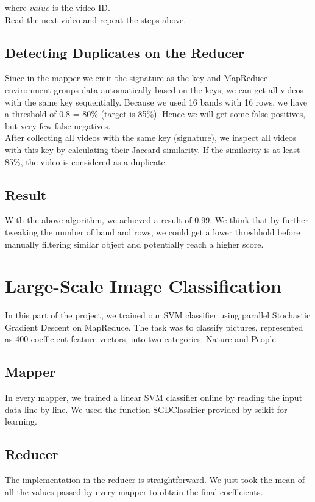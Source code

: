 \documentclass[a4paper, 11pt]{article}
\begin{document}
                where $value$ is the video ID.\\
                Read the next video and repeat the steps above.
                
        \subsection{Detecting Duplicates on the Reducer}
                Since in the mapper we emit the signature as the key and MapReduce environment groups data automatically based on the keys, we can get all videos with the same key sequentially. Because we used 16 bands with 16 rows, we have a threshold of 0.8 = 80\% (target is 85\%). Hence we will get some false positives, but very few false negatives.\\

                After collecting all videos with the same key (signature), we inspect all videos with this key by calculating their Jaccard similarity. If the similarity is at least 85\%, the video is considered as a duplicate.

        \subsection{Result}
                With the above algorithm, we achieved a result of 0.99. We think that by further tweaking the number of band and rows, we could get a lower threshhold before manually filtering similar object and potentially reach a higher score.

\newpage

\section{Large-Scale Image Classification}

In this part of the project, we trained our SVM classifier using parallel Stochastic Gradient Descent on MapReduce. The task was to classify pictures, represented as 400-coefficient feature vectors, into two categories: Nature and People.

\subsection{Mapper}
In every mapper, we trained a linear SVM classifier online by reading the input data line by line. We used the function SGDClassifier provided by scikit for learning.

\subsection{Reducer}
The implementation in the reducer is straightforward. We just took the mean of all the values passed by every mapper to obtain the final coefficients.
\end{document}
